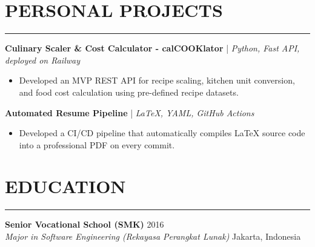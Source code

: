 \documentclass[10pt,a4paper]{article}
\begin{document}
\section*{PERSONAL PROJECTS}
\hrule
\vspace{0.2cm}
\textbf{Culinary Scaler \& Cost Calculator - calCOOKlator} | \textit{Python, Fast API, deployed on Railway}
\begin{itemize}[noitemsep, topsep=0pt]
    \item Developed an MVP REST API for recipe scaling, kitchen unit conversion, and food cost calculation using pre-defined recipe datasets.
\end{itemize}
\vspace{0.2cm}
\textbf{Automated Resume Pipeline} | \textit{LaTeX, YAML, GitHub Actions}
\begin{itemize}[noitemsep, topsep=0pt]
    \item Developed a CI/CD pipeline that automatically compiles LaTeX source code into a professional PDF on every commit.
\end{itemize}

\vspace{0.3cm}

\section*{EDUCATION}
\hrule
\vspace{0.2cm}
\textbf{Senior Vocational School (SMK)} \hfill 2016 \\
\textit{Major in Software Engineering (Rekayasa Perangkat Lunak)} \hfill Jakarta, Indonesia
\end{document}
